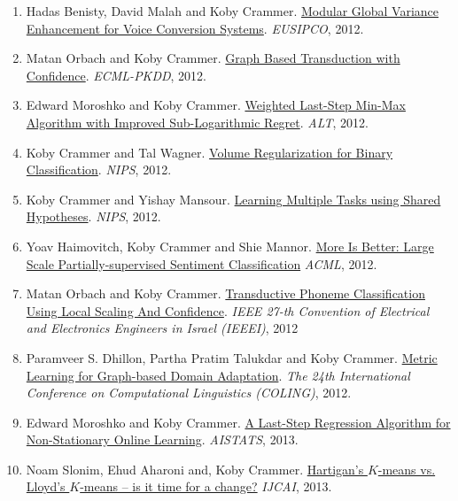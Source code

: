 \documentclass{resume}
\begin{document}
\begin{enumerate}
\item 
Hadas Benisty, David Malah and {Koby Crammer}.
\href{http://webee.technion.ac.il/people/koby/publications/1569582663.pdf}{Modular Global Variance Enhancement for Voice Conversion Systems}.
{\em EUSIPCO}, 2012.



\item 
Matan Orbach and {Koby Crammer}.
\href{http://webee.technion.ac.il/people/koby/publications/ecml12taco.pdf}{Graph Based Transduction with Confidence}.
{\em ECML-PKDD}, 2012.


\item

Edward Moroshko and {Koby Crammer}.
\href{http://webee.technion.ac.il/people/koby/publications/alt12.pdf}{Weighted Last-Step Min-Max Algorithm with Improved Sub-Logarithmic Regret}.
{\em ALT}, 2012.

\item Koby Crammer and {Tal Wagner}.
\href{}{Volume Regularization for Binary Classification}.
{\em NIPS}, 2012.


\item Koby Crammer and {Yishay Mansour}.
\href{}{Learning Multiple Tasks using Shared Hypotheses}.
{\em NIPS}, 2012.

\item Yoav Haimovitch, {Koby Crammer} and Shie Mannor.
\href{http://webee.technion.ac.il/people/koby/publications/haimovitch124.pdf}{More Is Better: Large Scale Partially-supervised Sentiment Classification}
{\em ACML}, 2012.

\item Matan Orbach and {Koby Crammer}.
\href{http://webee.technion.ac.il/people/koby/publications/taco_ieeei12.pdf}{Transductive Phoneme Classification Using Local Scaling And Confidence}.
{\em IEEE 27-th Convention of Electrical and Electronics
  Engineers in Israel (IEEEI)}, 2012

\item Paramveer S. Dhillon, Partha Pratim Talukdar and {Koby Crammer}.
\href{http://webee.technion.ac.il/people/koby/publications/graph_da_coling_2012}{Metric Learning for Graph-based Domain Adaptation}.
{\em The 24th International Conference on Computational Linguistics (COLING)}, 2012.


\item Edward Moroshko and {Koby Crammer}.
\href{}{A Last-Step Regression Algorithm for Non-Stationary Online Learning}.
{\em AISTATS}, 2013.


\item Noam Slonim, Ehud Aharoni and, {Koby Crammer}.
\href{}{Hartigan's $K$-means vs. Lloyd's $K$-means -- is it time for a change?}
{\em IJCAI}, 2013.


\end{enumerate}
\end{document}
